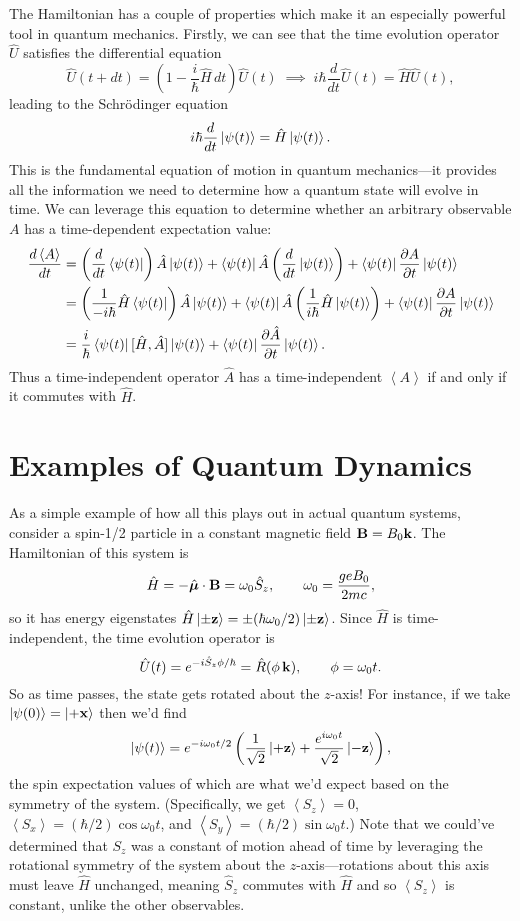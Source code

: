 \documentclass[../p116main.tex]{subfiles}
\begin{document}
The Hamiltonian has a couple of properties which make it an especially powerful tool in quantum mechanics.
Firstly, we can see that the time evolution operator $\hat U$ satisfies the differential equation
\[ \hat U(t + dt) = \left( 1 - \frac{i}{\hbar} \hat H \,dt \right) \hat U(t) \;\implies\; i\hbar \frac{d}{dt} \hat U(t) = \hat H \hat U(t), \]
leading to the Schrödinger equation
\[ i\hbar \frac{d}{dt} \left| \psi(t) \right> = \hat H \left| \psi(t) \right>. \]
This is the fundamental equation of motion in quantum mechanics---it provides all the information we need to determine how a quantum state will evolve in time.
We can leverage this equation to determine whether an arbitrary observable $A$ has a time-dependent expectation value:
\begin{align*}
    \frac{d \left< A \right>}{dt} &= \left( \frac{d}{dt} \left< \psi(t) \right| \right) \hat A \left| \psi(t) \right> + \left< \psi(t) \right| \hat A \left( \frac{d}{dt} \left| \psi(t) \right> \right) + \left< \psi(t) \right| \frac{\partial A}{\partial t} \left| \psi(t) \right> \\
    &= \left( \frac{1}{-i\hbar} \hat H \left< \psi(t) \right| \right) \hat A \left| \psi(t) \right> + \left< \psi(t) \right| \hat A \left( \frac{1}{i\hbar} \hat H \left| \psi(t) \right> \right) + \left< \psi(t) \right| \frac{\partial A}{\partial t} \left| \psi(t) \right> \\
    &= \frac{i}{\hbar} \left< \psi(t) \right| [\hat H, \hat A] \left| \psi(t) \right> + \left< \psi(t) \right| \frac{\partial \hat A}{\partial t} \left| \psi(t) \right>.
\end{align*}
Thus a time-independent operator $\hat A$ has a time-independent $\left< A \right>$ if and only if it commutes with $\hat H$.

\section{Examples of Quantum Dynamics}
As a simple example of how all this plays out in actual quantum systems, consider a spin-1/2 particle in a constant magnetic field $\mathbf{B} = B_0 \mathbf{k}$.
The Hamiltonian of this system is
\[ \hat H = -\hat{\bm \mu} \cdot \mathbf{B} = \omega_0 \hat S_z, \qquad \omega_0 = \frac{ge B_0}{2mc}, \]
so it has energy eigenstates $\hat H \left| \pm \mathbf{z} \right> = \pm (\hbar \omega_0 / 2) \left| \pm \mathbf{z} \right>$.
Since $\hat H$ is time-independent, the time evolution operator is
\[ \hat U(t) = e^{-i \hat S_z \phi / \hbar} = \hat R(\phi \,\mathbf{k}), \qquad \phi = \omega_0 t. \]
So as time passes, the state gets rotated about the $z$-axis!
For instance, if we take $\left| \psi(0) \right> = \left| +\mathbf{x} \right>$ then we'd find
\[ \left| \psi(t) \right> = e^{-i \omega_0 t / 2} \left( \frac{1}{\sqrt{2}} \left| +\mathbf{z} \right> + \frac{e^{i \omega_0 t}}{\sqrt{2}} \left| -\mathbf{z} \right> \right), \]
the spin expectation values of which are what we'd expect based on the symmetry of the system.
(Specifically, we get $\left< S_z \right> = 0$, $\left< S_x \right> = (\hbar / 2) \cos \omega_0 t$, and $\left< S_y \right> = (\hbar / 2) \sin \omega_0 t$.)
Note that we could've determined that $S_z$ was a constant of motion ahead of time by leveraging the rotational symmetry of the system about the $z$-axis---rotations about this axis must leave $\hat H$ unchanged, meaning $\hat S_z$ commutes with $\hat H$ and so $\left< S_z \right>$ is constant, unlike the other observables.
\end{document}
